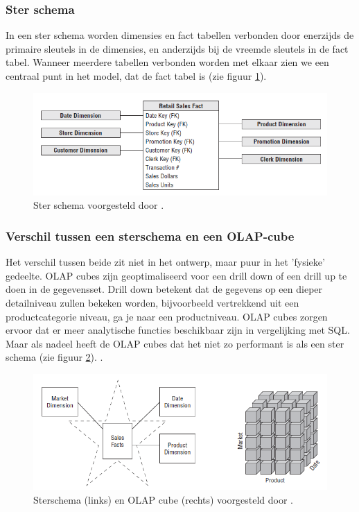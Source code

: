 \subsubsection{Ster schema}
In een ster schema worden dimensies en fact tabellen verbonden door enerzijds de primaire sleutels in de dimensies, en anderzijds bij de vreemde sleutels in de fact tabel. Wanneer meerdere tabellen verbonden worden met elkaar zien we een centraal punt in het model, dat de fact tabel is (zie figuur \ref{fig:ster}). 

\begin{figure}[h]
	\includegraphics[scale=0.8]{../images/ster.PNG}
	\caption{Ster schema voorgesteld door \textcite{Kimball2013}.}
	\label{fig:ster}
\end{figure}

\subsubsection{Verschil tussen een sterschema en een OLAP-cube}
Het verschil tussen beide zit niet in het ontwerp, maar puur in het 'fysieke' gedeelte.
OLAP cubes zijn geoptimaliseerd voor een drill down of een drill up te doen in de gegevensset.
Drill down betekent dat de gegevens op een dieper detailniveau zullen bekeken worden, bijvoorbeeld vertrekkend uit een productcategorie niveau, ga je naar een productniveau. OLAP cubes zorgen ervoor dat er meer analytische functies beschikbaar zijn in vergelijking met SQL. Maar als nadeel heeft de OLAP cubes dat het niet zo performant is als een ster schema  (zie figuur \ref{fig:stervsolap}).  \autocite{Kimball2013}. 

\begin{figure}[h]
	\includegraphics[scale=0.8]{../images/starvsolap.PNG}
	\caption{Sterschema (links) en OLAP cube (rechts) voorgesteld door \textcite{Kimball2013}.}
	\label{fig:stervsolap}
\end{figure}
\pagebreak
